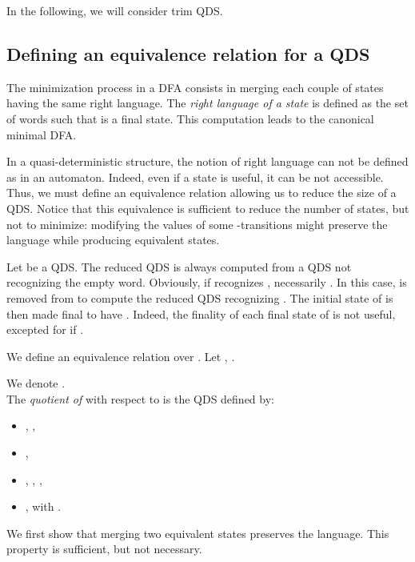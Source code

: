 \documentclass[11pt]{elsarticle}
\newcommand\modif[2]{{#2}}
\begin{document}
 In the following, we will consider trim QDS.

\subsection{Defining an equivalence relation  for a QDS}

The minimization process in a DFA consists in merging each 
couple of states having the same right language.
The \emph{right language of a state}  is defined as the set of words  such that  is a final state. This computation leads to the canonical minimal DFA.

In a quasi-deterministic structure, the notion of right language can not be defined as in an automaton. Indeed, even if a state is useful, it can be not accessible. Thus, we \modif{can}{must} define an equivalence relation allowing us to reduce the size of a QDS. Notice that this
equivalence is sufficient
to reduce the number of states, but not to minimize: modifying the values of some -transitions might preserve the language while producing equivalent states.

Let  be a QDS. The reduced QDS is always computed from a QDS not recognizing the empty word. Obviously, if  recognizes , necessarily . In this case,  is removed from  to compute the reduced QDS  recognizing . The initial state of  is then made final to have . Indeed, the finality of each final state of  is not useful, excepted for  if .

We define an equivalence relation  over . Let , .


 

 \noindent
We denote .\\
  
  
The \emph{quotient of}  with respect to  is the QDS  defined by:
  \begin{itemize}
    \item , ,
\item , 
\item , , ,
    \item ,  with .
  \end{itemize}  
  \modif{where for any state , .}{}
  
  We first show that merging two equivalent states preserves the language. This property is sufficient, but not necessary. 
\end{document}
